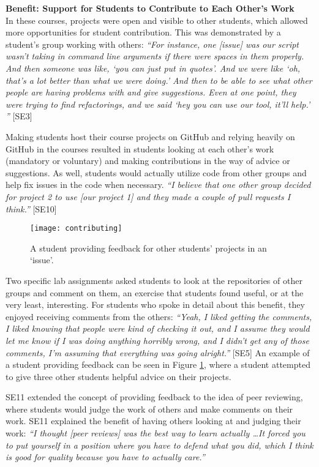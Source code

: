 \textbf{Benefit: Support for Students to Contribute to Each Other's Work} \\
In these courses, projects were open and visible to other students, which allowed more opportunities for student contribution. This was demonstrated by a student's group working with others:
\textit{``For instance, one [issue] was our script wasn't taking in command line arguments if there were spaces in them properly. And then someone was like, `you can just put in quotes'. And we were like `oh, that's a lot better than what we were doing.' And then to be able to see what other people are having problems with and give suggestions. Even at one point, they were trying to find refactorings, and we said `hey you can use our tool, it'll help.' ''} [SE3]

Making students host their course projects on GitHub and relying heavily on GitHub in the courses resulted in students looking at each other's work (mandatory or voluntary) and making contributions in the way of advice or suggestions. As well, students would actually utilize code from other groups and help fix issues in the code when necessary. \textit{``I believe that one other group decided for project 2 to use [our project 1] and they made a couple of pull requests I think.''} [SE10]

\begin{figure}[h!]
 \caption{A student providing feedback for other students' projects in an `issue'.}
 \centering
   \texttt{[image: contributing]}
 \label{fig:contributing}
\end{figure}

Two specific lab assignments asked students to look at the repositories of other groups and comment on them, an exercise that students found useful, or at the very least, interesting. For students who spoke in detail about this benefit, they enjoyed receiving comments from the others: \textit{``Yeah, I liked getting the comments, I liked knowing that people were kind of checking it out, and I assume they would let me know if I was doing anything horribly wrong, and I didn't get any of those comments, I'm assuming that everything was going alright.''} [SE5] An example of a student providing feedback can be seen in Figure \ref{fig:contributing}, where a student attempted to give three other students helpful advice on their projects.

SE11 extended the concept of providing feedback to the idea of peer reviewing, where students would judge the work of others and make comments on their work. SE11 explained the benefit of having others looking at and judging their work: \textit{``I thought [peer reviews] was the best way to learn actually \ldots It forced you to put yourself in a position where you have to defend what you did, which I think is good for quality because you have to actually care.''}

